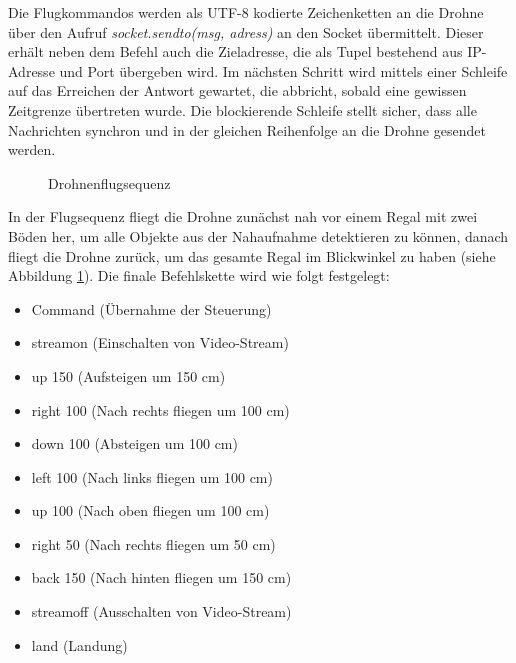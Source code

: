 Die Flugkommandos werden als UTF-8 kodierte Zeichenketten an die Drohne über den Aufruf \textit{socket.sendto(msg, adress)} an den Socket übermittelt. Dieser erhält neben dem Befehl auch die Zieladresse, die als Tupel bestehend aus IP-Adresse und Port übergeben wird. Im nächsten Schritt wird mittels einer Schleife auf das Erreichen der Antwort gewartet, die abbricht, sobald eine gewissen Zeitgrenze übertreten wurde. Die blockierende Schleife stellt sicher, dass alle Nachrichten synchron und in der gleichen Reihenfolge an die Drohne gesendet werden.

\begin{figure}[ht]
	\caption[Drohnenflugsequenz]{Drohnenflugsequenz} 
	\label{sequenz}
\end{figure} 

In der Flugsequenz fliegt die Drohne zunächst nah vor einem Regal mit zwei Böden her, um alle Objekte aus der Nahaufnahme detektieren zu können, danach fliegt die Drohne zurück, um das gesamte Regal im Blickwinkel zu haben (siehe Abbildung \ref{sequenz}). Die finale Befehlskette wird wie folgt festgelegt:

\begin{itemize}
	\item Command (Übernahme der Steuerung)
	\item streamon (Einschalten von Video-Stream)
	\item up 150 (Aufsteigen um 150 cm)
	\item right 100 (Nach rechts fliegen um 100 cm)
	\item down 100 (Absteigen um 100 cm)
	\item left 100 (Nach links fliegen um 100 cm)
	\item up 100 (Nach oben fliegen um 100 cm)
	\item right 50 (Nach rechts fliegen um 50 cm)
	\item back 150 (Nach hinten fliegen um 150 cm)
	\item streamoff (Ausschalten von Video-Stream)
	\item land (Landung)
\end{itemize}

